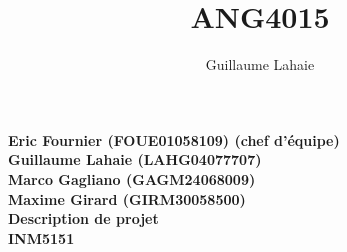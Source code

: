 \documentclass[letterpaper,11pt]{letter}
\title{ANG4015}
\author{Guillaume Lahaie}
\begin{document}
\begin{center}{\Large{\bf 
Eric Fournier (FOUE01058109) (chef d'équipe)\\
Guillaume Lahaie (LAHG04077707)\\
Marco Gagliano (GAGM24068009)\\
Maxime Girard (GIRM30058500)\\
Description de projet\\
INM5151\\}}
\end{center}
\end{document}
